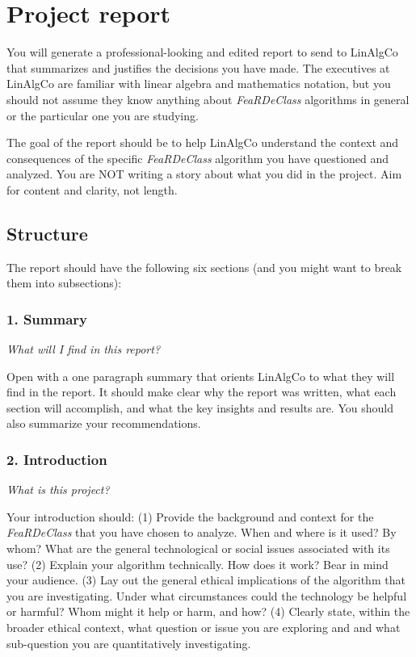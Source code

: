 \section{Project report}

You will generate a professional-looking and edited report to send to LinAlgCo that summarizes and justifies the decisions you have made. The executives at LinAlgCo are familiar with linear algebra and mathematics notation, but you should not assume they know anything about \textit{FeaRDeClass} algorithms in general or the particular one you are studying.

The goal of the report should be to help LinAlgCo understand the context and consequences of the specific \textit{FeaRDeClass} algorithm you have questioned and analyzed. You are NOT writing a story about what you did in the project. Aim for content and clarity, not length.

\subsection{Structure}

The report should have the following six sections (and you might want to break them into subsections):

\subsubsection{1. Summary}
\textit{What will I find in this report?}

Open with a one paragraph summary that orients LinAlgCo to what they will find in the report.  It should make clear why the report was written, what each section will accomplish, and what the key insights and results are. You should also summarize your recommendations. 

\subsubsection{2. Introduction}
\textit{What is this project?}

Your introduction should: (1) Provide the background and context for the \textit{FeaRDeClass} that you have chosen to analyze. When and where is it used? By whom? What are the general technological or social issues associated with its use? (2) Explain your algorithm technically. How does it work? Bear in mind your audience. (3) Lay out the general ethical implications of the algorithm that you are investigating. Under what circumstances could the technology be helpful or harmful? Whom might it help or harm, and how? (4) Clearly state, within the broader ethical context, what question or issue you are exploring and and what sub-question you are quantitatively investigating.
    
